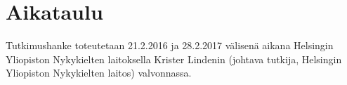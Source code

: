 \documentclass[12pt,a4paper,finnish,oneside]{article}
\begin{document}


\section{Aikataulu}

Tutkimushanke toteutetaan 21.2.2016 ja 28.2.2017 välisenä aikana Helsingin Yliopiston Nykykielten laitoksella Krister Lindenin (johtava tutkija, Helsingin Yliopiston Nykykielten laitos) valvonnassa. 




\end{document}
